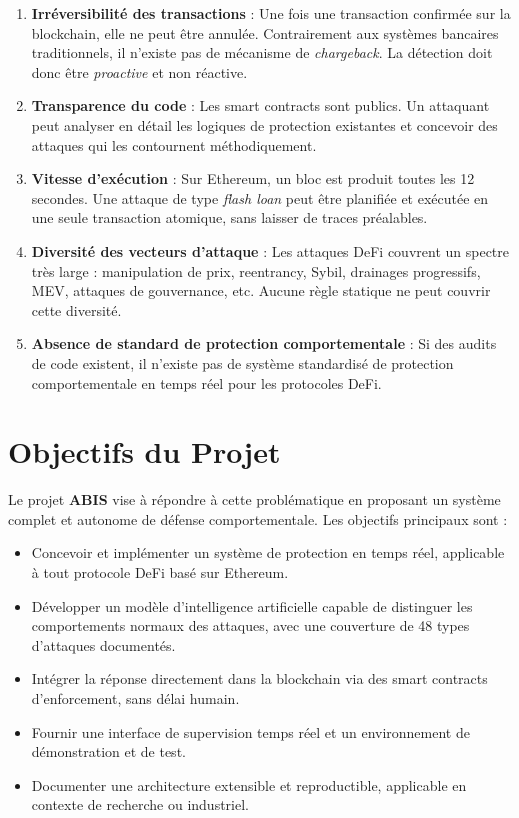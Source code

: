 \documentclass[12pt,a4paper]{report}
\begin{document}
\begin{enumerate}
  \item \textbf{Irréversibilité des transactions} : Une fois une transaction confirmée sur la blockchain, elle ne peut être annulée. Contrairement aux systèmes bancaires traditionnels, il n'existe pas de mécanisme de \textit{chargeback}. La détection doit donc être \textit{proactive} et non réactive.

  \item \textbf{Transparence du code} : Les smart contracts sont publics. Un attaquant peut analyser en détail les logiques de protection existantes et concevoir des attaques qui les contournent méthodiquement.

  \item \textbf{Vitesse d'exécution} : Sur Ethereum, un bloc est produit toutes les 12 secondes. Une attaque de type \textit{flash loan} peut être planifiée et exécutée en une seule transaction atomique, sans laisser de traces préalables.

  \item \textbf{Diversité des vecteurs d'attaque} : Les attaques DeFi couvrent un spectre très large : manipulation de prix, reentrancy, Sybil, drainages progressifs, MEV, attaques de gouvernance, etc. Aucune règle statique ne peut couvrir cette diversité.

  \item \textbf{Absence de standard de protection comportementale} : Si des audits de code existent, il n'existe pas de système standardisé de protection comportementale en temps réel pour les protocoles DeFi.
\end{enumerate}

\section{Objectifs du Projet}

Le projet \textbf{ABIS} vise à répondre à cette problématique en proposant un système complet et autonome de défense comportementale. Les objectifs principaux sont :

\begin{itemize}
  \item Concevoir et implémenter un système de protection en temps réel, applicable à tout protocole DeFi basé sur Ethereum.
  \item Développer un modèle d'intelligence artificielle capable de distinguer les comportements normaux des attaques, avec une couverture de 48 types d'attaques documentés.
  \item Intégrer la réponse directement dans la blockchain via des smart contracts d'enforcement, sans délai humain.
  \item Fournir une interface de supervision temps réel et un environnement de démonstration et de test.
  \item Documenter une architecture extensible et reproductible, applicable en contexte de recherche ou industriel.
\end{itemize}
\end{document}

